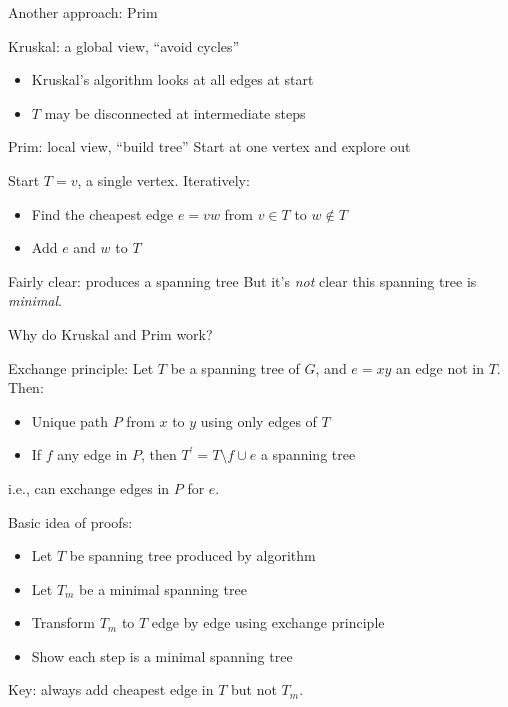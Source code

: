 \documentclass{beamer}
\begin{document}
  
  \begin{frame}{Another approach: Prim}
\begin{block}{Kruskal:  a global view, ``avoid cycles''}
  \begin{itemize}
  \item Kruskal's algorithm looks at all edges at start
  \item $T$ may be disconnected at intermediate steps
    \end{itemize}
\end{block}
\begin{block}{Prim: local view, ``build tree''}
  Start at one vertex and explore out
\end{block}

\begin{definition}
  Start $T={v}$, a single vertex.  Iteratively:
  \begin{itemize}    \item Find the cheapest edge $e=vw$ from $v\in T$ to $w\notin T$
  \item Add $e$ and $w$ to $T$
  \end{itemize}
\end{definition}
\begin{block}{Fairly clear: produces a spanning tree}
  But it's \emph{not} clear this spanning tree is \emph{minimal}.
  \end{block}

    

\end{frame}
  \begin{frame}{Why do Kruskal and Prim work?}
    \begin{block}{Exchange principle:}
      Let $T$ be a spanning tree of $G$, and $e=xy$ an edge not in $T$. Then:
      \begin{itemize}
      \item Unique path $P$ from $x$ to $y$ using only edges of $T$
      \item If $f$ any edge in $P$, then $T^\prime=T\setminus f\cup e$ a spanning tree
      \end{itemize}
i.e., can exchange edges in $P$ for $e$.
    \end{block}

    \begin{block}{Basic idea of proofs:}
      \begin{itemize}
        \item Let $T$ be spanning tree produced by algorithm 
\item  Let $T_m$ be a minimal spanning tree 
     \item  Transform $T_m$ to $T$ edge by edge using exchange principle 
\item   Show each step is a minimal spanning tree
\end{itemize}
Key: always add cheapest edge in $T$ but not $T_m$.
    \end{block}
\end{frame}
\end{document}
